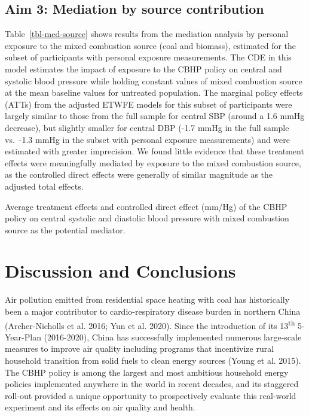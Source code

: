 \documentclass[
  letterpaper,
  DIV=11,
  numbers=noendperiod]{scrartcl}
\makeatletter
\renewenvironment{table}%
   {\renewcommand\familydefault\sfdefault
    \@float{table}}
   {\end@float}
\makeatother
\begin{document}
\subsection{Aim 3: Mediation by source
contribution}\label{aim-3-mediation-by-source-contribution}

Table~\ref{tbl-med-source} shows results from the mediation analysis by
personal exposure to the mixed combustion source (coal and biomass),
estimated for the subset of participants with personal exposure
measurements. The CDE in this model estimates the impact of exposure to
the CBHP policy on central and systolic blood pressure while holding
constant values of mixed combustion source at the mean baseline values
for untreated population. The marginal policy effects (ATTs) from the
adjusted ETWFE models for this subset of participants were largely
similar to those from the full sample for central SBP (around a 1.6 mmHg
decrease), but slightly smaller for central DBP (-1.7 mmHg in the full
sample vs.~-1.3 mmHg in the subset with personal exposure measurements)
and were estimated with greater imprecision. We found little evidence
that these treatment effects were meaningfully mediated by exposure to
the mixed combustion source, as the controlled direct effects were
generally of similar magnitude as the adjusted total effects.

\begin{table}

\caption{\label{tbl-med-source}Average treatment effects and controlled
direct effect (mm/Hg) of the CBHP policy on central systolic and
diastolic blood pressure with mixed combustion source as the potential
mediator.}

\centering{

}

\end{table}%

\section{Discussion and Conclusions}\label{discussion-and-conclusions}

Air pollution emitted from residential space heating with coal has
historically been a major contributor to cardio-respiratory disease
burden in northern China (Archer-Nicholls et al. 2016; Yun et al. 2020).
Since the introduction of its 13\textsuperscript{th} 5-Year-Plan
(2016-2020), China has successfully implemented numerous large-scale
measures to improve air quality including programs that incentivize
rural household transition from solid fuels to clean energy sources
(Young et al. 2015). The CBHP policy is among the largest and most
ambitious household energy policies implemented anywhere in the world in
recent decades, and its staggered roll-out provided a unique opportunity
to prospectively evaluate this real-world experiment and its effects on
air quality and health.
\end{document}
